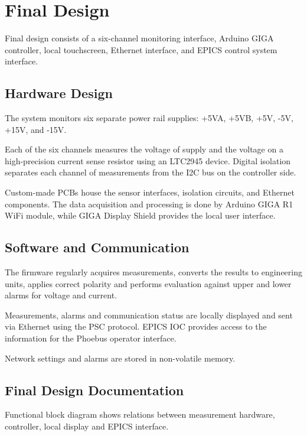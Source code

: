 
\chapter{Final Design}
\label{chap:finaldesign}

Final design consists of a six-channel monitoring
interface, Arduino GIGA controller, local touchscreen,
Ethernet interface, and EPICS control system interface.

\section{Hardware Design}

The system monitors six separate power rail supplies:
+5VA, +5VB, +5V, -5V, +15V, and -15V.

Each of the six channels measures the voltage of
supply and the voltage on a high-precision current sense
resistor using an LTC2945 device. Digital isolation
separates each channel of measurements from the I2C bus
on the controller side.

Custom-made PCBs house the sensor interfaces, isolation
circuits, and Ethernet components. The data acquisition and
processing is done by Arduino GIGA R1 WiFi module, while
GIGA Display Shield provides the local user interface.

\section{Software and Communication}

The firmware regularly acquires measurements, converts
the results to engineering units, applies correct polarity
and performs evaluation against upper and lower alarms for
voltage and current.

Measurements, alarms and communication status are locally
displayed and sent via Ethernet using the PSC protocol.
EPICS IOC provides access to the information for the Phoebus
operator interface.

Network settings and alarms are stored in non-volatile memory.

\section{Final Design Documentation}

Functional block diagram shows relations between measurement
hardware, controller, local display and EPICS interface.

